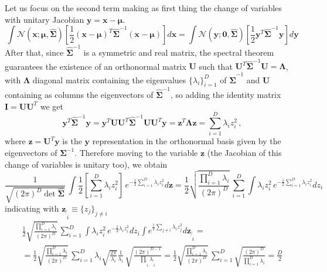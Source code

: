 \documentclass[a4paper, 10pt]{article}
\begin{document}
Let us focus on the second term making as first thing the change of variables with unitary Jacobian $\mathbf y = \mathbf x - \bm \mu$. 
\begin{equation}
\int \mathcal{N}(\mathbf x; \bm \mu, \bm{\hat{\Sigma}}) \left[ \frac{1}{2} (\mathbf x-\boldsymbol \mu)^T \boldsymbol{\hat{\Sigma}}^{-1} (\mathbf x-\boldsymbol \mu) \right] d \mathbf x = 
\int \mathcal{N}(\mathbf y; \bm 0, \bm{\hat{\Sigma}}) \left[ \frac{1}{2} \mathbf y^T \boldsymbol{\hat{\Sigma}}^{-1} \mathbf y \right] d \mathbf y
\end{equation}
After that, since $\bm{\hat{\Sigma}} ^{-1}$ is a symmetric and real matrix, the spectral theorem guarantees the existence of an orthonormal matrix $\mathbf U$ such that $ \mathbf U^{T} \mathbf{\hat{\Sigma}}^{-1} \mathbf U = \bm \Lambda$, with $\bm \Lambda$ diagonal matrix containing the eigenvalues $\lbrace \lambda_i \rbrace_{i=1}^D$ of $\bm{\hat{\Sigma}}^{-1}$ and $\mathbf U$ containing as columns the eigenvectors of $\bm{\hat{\Sigma}}^{-1}$, so adding the identity matrix $\mathbf I = \mathbf U \mathbf U^{T}$ we get
\begin{equation}
\mathbf y^{T} \bm{\hat{\Sigma}}^{-1} \mathbf y = \mathbf y^{T} \mathbf U \mathbf U^{T} \bm{\hat{\Sigma}}^{-1} \mathbf U \mathbf U^{T} \mathbf y = \mathbf z^{T} \bm \Lambda \mathbf z = \sum_{i=1}^{D} \lambda_i z_i^2  \, ,
\end{equation}
where $\mathbf z = \mathbf U^{T} \mathbf y$ is the $\mathbf y$ representation in the orthonormal basis given by the eigenvectors of $\bm \Sigma^{-1}$. Therefore moving to the variable $\mathbf z$ (the Jacobian of this change of variables is unitary too), we obtain
\begin{equation}
\frac{1}{\sqrt{( 2 \pi)^{D} \det \boldsymbol{\hat{\Sigma}}}} \, \int \frac{1}{2} \left[ \sum_{i=1}^{D} \lambda_i z_i^2 \right] \, e^{ - \frac{1}{2} \sum_{i=1}^D \lambda_i z_i^2 } d \mathbf z = \frac{1}{2} \sqrt{\frac{\prod_{i=1}^D \lambda_i}{( 2 \pi)^{D}}} \, \sum_{i=1}^{D} \int \lambda_i z_i^2 \, e^{ - \frac{1}{2} \sum_{i=1}^{D} \lambda_i z_i^2} d z_{i} 
\end{equation}
indicating with $\mathbf z_{\not{ \, i}} \equiv \lbrace z_j \rbrace_{j \neq i}$
\begin{multline}
\frac{1}{2} \sqrt{\frac{\prod_{i=1}^D \lambda_i}{( 2 \pi)^{D}}} \, \sum_{i=1}^{D} \int \lambda_i z_i^2 \, e^{ - \frac{1}{2} \lambda_i z_i^2} d z_i \int e^{\frac{1}{2} \sum_{j \neq i} \lambda_i z_j^2} d \mathbf z_{\not{\, i}} = \\
= \frac{1}{2} \sqrt{\frac{\prod_{i=1}^D \lambda_i}{( 2 \pi)^{D}}} \, \sum_{i=1}^{D} \lambda_i \sqrt{\frac{2 \pi}{\lambda_i}} \frac{1}{\lambda_i} \, \sqrt{\frac{(2\pi)^{D-1}}{\prod_{\not{\, i}} \lambda_{\not{\, i}}}} = \frac{1}{2} \sqrt{\frac{\prod_{i=1}^D \lambda_i}{( 2 \pi)^{D}}} \, \sum_{i=1}^{D} \sqrt{\frac{(2 \pi)^D}{\prod_{i=1}^D \lambda_i}}  = \frac{D}{2}
\end{multline}
\end{document}
